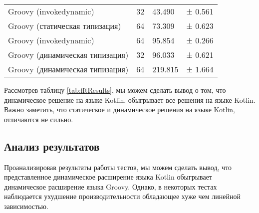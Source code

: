 \begin{table}[h]
\begin{center}
\begin{tabular}{|l|l|l|l|}
Groovy (invokedynamic)                   & 32 &  43.490 & ± 0.561 \\
Groovy (статическая типизация)           & 64 &  73.309 & ± 0.623 \\
Groovy (invokedynamic)                   & 64 &  95.854 & ± 0.266 \\
Groovy (динамическая типизация)          & 32 &  96.033 & ± 0.621 \\
Groovy (динамическая типизация)          & 64 & 219.815 & ± 1.664 \\
\hline
\end{tabular}
\end{center}
\end{table} 

Рассмотрев таблицу \ref{tab:fftResults}, мы можем сделать вывод о том, что динамическое решение на языке Kotlin, обыгрывает все решения на языке Kotlin. Важно заметить, что статическое и динамическое решения на языке Kotlin, отличаются не сильно.


\subsection{Анализ результатов}

Проанализировав результаты работы тестов, мы можем сделать вывод, что представленное динамическое расширение языка Kotlin обыгрывает динамическое расширение языка Groovy. Однако, в некоторых тестах наблюдается ухудшение производительности обладающее хуже чем линейной зависимостью. 